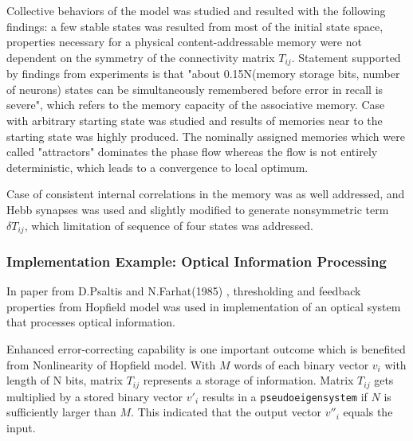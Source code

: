 Collective behaviors of the model was studied and resulted with the following findings: a few stable states was resulted from most of the initial state space, properties necessary for a physical content-addressable memory were not dependent on the symmetry of the connectivity matrix $T_{ij}$. Statement supported by findings from experiments is that "about 0.15N(memory storage bits, number of neurons) states can be simultaneously remembered before error in recall is severe", which refers to the memory capacity of the associative memory. Case with arbitrary starting state was studied and results of memories near to the starting state was highly produced. The nominally assigned memories which were called "attractors" dominates the phase flow whereas the flow is not entirely deterministic, which leads to a convergence to local optimum.

Case of consistent internal correlations in the memory was as well addressed, and Hebb synapses was used and slightly modified to generate nonsymmetric term~$\delta T_{ij}$, which limitation of sequence of four states was addressed.

\subsubsection{Implementation Example: Optical Information Processing}
In paper from D.Psaltis and N.Farhat(1985) \cite{optical_processing}, thresholding and feedback properties from Hopfield model was used in implementation of an optical system that processes optical information.

Enhanced error-correcting capability is one important outcome which is benefited from Nonlinearity of Hopfield model. With $M$ words of each binary vector $v_i$ with length of N bits, matrix $T_{ij}$ represents a storage of information. Matrix $T_{ij}$ gets multiplied by a stored binary vector $v'_i$ results in a \texttt{pseudoeigensystem} if $N$ is sufficiently larger than $M$. This indicated that the output vector $v''_i$ equals the input.


